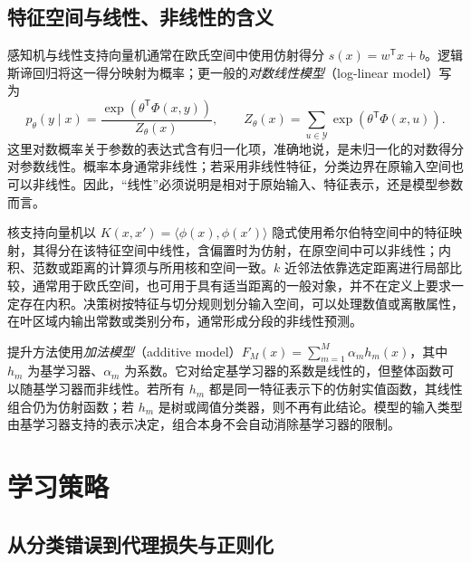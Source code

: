 \subsection{特征空间与线性、非线性的含义}
\label{subsec:lh-summary-representations}

感知机与线性支持向量机通常在欧氏空间中使用仿射得分 $s(x)=w^{\mathsf T}x+b$。逻辑斯谛回归将这一得分映射为概率；更一般的\emph{对数线性模型}（log-linear model）写为
\begin{equation}
p_\theta(y\mid x)=\frac{\exp(\theta^{\mathsf T}\Phi(x,y))}{Z_\theta(x)},
\qquad Z_\theta(x)=\sum_{u\in\mathcal Y}\exp(\theta^{\mathsf T}\Phi(x,u)).
\label{eq:lh-summary-log-linear}
\end{equation}
这里对数概率关于参数的表达式含有归一化项，准确地说，是未归一化的对数得分对参数线性。概率本身通常非线性；若采用非线性特征，分类边界在原输入空间也可以非线性。因此，“线性”必须说明是相对于原始输入、特征表示，还是模型参数而言。

核支持向量机以 $K(x,x')=\langle\phi(x),\phi(x')\rangle$ 隐式使用希尔伯特空间中的特征映射，其得分在该特征空间中线性，含偏置时为仿射，在原空间中可以非线性；内积、范数或距离的计算须与所用核和空间一致。$k$ 近邻法依靠选定距离进行局部比较，通常用于欧氏空间，也可用于具有适当距离的一般对象，并不在定义上要求一定存在内积。决策树按特征与切分规则划分输入空间，可以处理数值或离散属性，在叶区域内输出常数或类别分布，通常形成分段的非线性预测。

提升方法使用\emph{加法模型}（additive model）$F_M(x)=\sum_{m=1}^M\alpha_m h_m(x)$，其中 $h_m$ 为基学习器、$\alpha_m$ 为系数。它对给定基学习器的系数是线性的，但整体函数可以随基学习器而非线性。若所有 $h_m$ 都是同一特征表示下的仿射实值函数，其线性组合仍为仿射函数；若 $h_m$ 是树或阈值分类器，则不再有此结论。模型的输入类型由基学习器支持的表示决定，组合本身不会自动消除基学习器的限制。

\section{学习策略}
\label{sec:lh-summary-strategies}

\subsection{从分类错误到代理损失与正则化}
\label{subsec:lh-summary-surrogate-losses}

